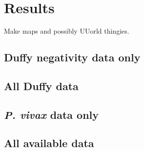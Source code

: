 \section*{Results}

Make maps and possibly UUorld thingies.

\subsection*{Duffy negativity data only}

\subsection*{All Duffy data}

\subsection*{\emph{P. vivax} data only}

\subsection*{All available data}
